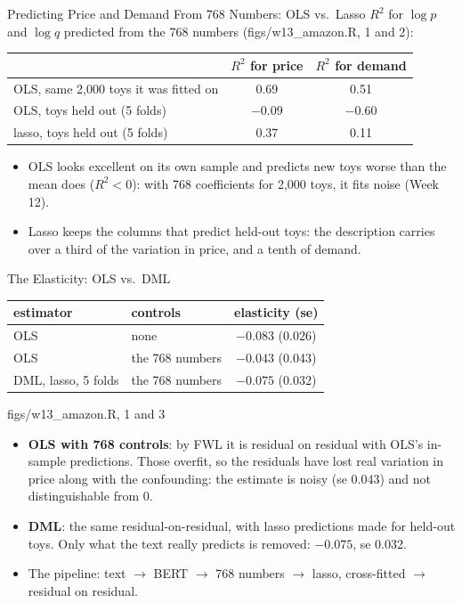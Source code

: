 \documentclass[aspectratio=169,11pt,xcolor=dvipsnames]{beamer}
\newcommand{\srcp}[1]{{\scriptsize\color{gray}(#1)}}
\begin{document}
\begin{frame}{Predicting Price and Demand From 768 Numbers: OLS vs.\ Lasso}
$R^2$ for $\log p$ and $\log q$ predicted from the 768 numbers \srcp{figs/w13\_amazon.R, 1 and 2}:
\begin{center}\small
\renewcommand{\arraystretch}{1.15}
\begin{tabular}{@{}lcc@{}}
\toprule
 & $R^2$ for price & $R^2$ for demand \\
\midrule
OLS, same 2,000 toys it was fitted on & 0.69 & 0.51 \\
OLS, toys held out (5 folds) & $-0.09$ & $-0.60$ \\
lasso, toys held out (5 folds) & 0.37 & 0.11 \\
\bottomrule
\end{tabular}
\end{center}
\vskip2pt
\begin{itemize}\itemsep4pt
  \item OLS looks excellent on its own sample and predicts new toys worse than the mean does
        ($R^2 < 0$): with 768 coefficients for 2,000 toys, it fits noise (Week 12).
  \item Lasso keeps the columns that predict held-out toys: the description carries over a third
        of the variation in price, and a tenth of demand.
\end{itemize}
\end{frame}

\begin{frame}{The Elasticity: OLS vs.\ DML}
\begin{center}\small
\renewcommand{\arraystretch}{1.15}
\begin{tabular}{@{}llc@{}}
\toprule
estimator & controls & elasticity (se) \\
\midrule
OLS & none & $-0.083$ (0.026) \\
OLS & the 768 numbers & $-0.043$ (0.043) \\
DML, lasso, 5 folds & the 768 numbers & $-0.075$ (0.032) \\
\bottomrule
\end{tabular}
\end{center}
{\footnotesize\color{gray}figs/w13\_amazon.R, 1 and 3}
\vskip2pt
\begin{itemize}\itemsep4pt
  \item \textbf{OLS with 768 controls}: by FWL it is residual on residual with OLS's in-sample
        predictions. Those overfit, so the residuals have lost real variation in price along with
        the confounding: the estimate is noisy (se 0.043) and not distinguishable from 0.
  \item \textbf{DML}: the same residual-on-residual, with lasso predictions made for held-out toys.
        Only what the text really predicts is removed: $-0.075$, se 0.032.
  \item The pipeline: text $\to$ BERT $\to$ 768 numbers $\to$ lasso, cross-fitted $\to$ residual on residual.
\end{itemize}
\end{frame}
\end{document}
